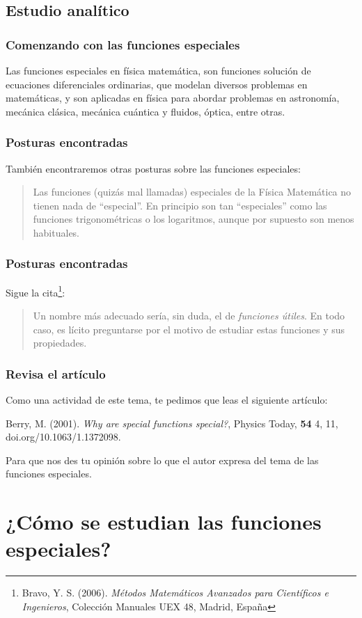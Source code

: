 \subsection{Estudio analítico}
\begin{frame}
\frametitle{Comenzando con las funciones especiales}
Las funciones especiales en física matemática, son funciones solución de ecuaciones diferenciales ordinarias, que modelan diversos problemas en matemáticas, y son aplicadas en física para abordar problemas en astronomía, mecánica clásica, mecánica cuántica y fluidos, óptica, entre otras.
\end{frame}
\begin{frame}
\frametitle{Posturas encontradas}
También encontraremos otras posturas sobre las funciones especiales: 
\begin{quote}
Las funciones (quizás mal llamadas) especiales de la Física Matemática no tienen nada de \enquote{especial}. En principio son tan \enquote{especiales} como las funciones trigonométricas o los logaritmos, aunque por supuesto son menos habituales.
\end{quote}
\end{frame}
\begin{frame}
\frametitle{Posturas encontradas}
Sigue la cita\footnote{Bravo, Y. S. (2006). \textit{Métodos Matemáticos Avanzados para Científicos e Ingenieros}, Colección Manuales UEX 48, Madrid, España}:
\begin{quote}
Un nombre más adecuado sería, sin duda, el de \emph{funciones útiles}. En todo caso, es lícito preguntarse por el motivo de estudiar estas funciones y sus propiedades.
\end{quote}
\end{frame}
\begin{frame}
\frametitle{Revisa el artículo}
Como una actividad de este tema, te pedimos que leas el siguiente artículo: 
\begin{thebibliography}{X}
 Berry, M. (2001). \textit{Why are special functions special?}, Physics Today, \textbf{54} 4, 11, doi.org/10.1063/1.1372098.
\end{thebibliography}
Para que nos des tu opinión sobre lo que el autor expresa del tema de las funciones especiales.
\end{frame}
\section{¿Cómo se estudian las funciones especiales?}
